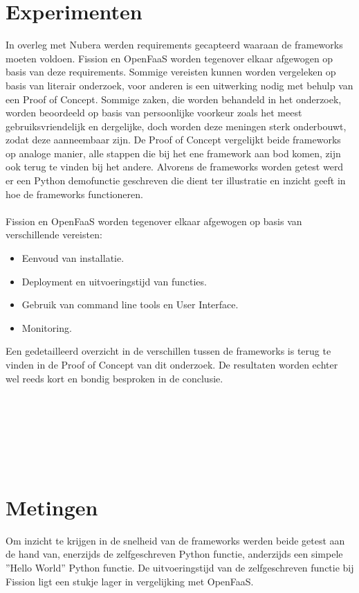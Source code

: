 \documentclass[a0,portrait]{a0poster}
\begin{document}
\begin{multicols}{2}
\color{Black} %
\color{HoGentAccent1} 
\section*{Experimenten}
\color{black}
In overleg met Nubera werden requirements gecapteerd waaraan de frameworks moeten voldoen. Fission en OpenFaaS worden tegenover elkaar afgewogen op basis van deze requirements. Sommige vereisten kunnen worden vergeleken op basis van literair onderzoek, voor anderen is een uitwerking nodig met behulp van een Proof of Concept. 
Sommige zaken, die worden behandeld in het onderzoek, worden beoordeeld op basis van persoonlijke voorkeur zoals het meest gebruiksvriendelijk en dergelijke, doch worden deze meningen sterk onderbouwt, zodat deze aanneembaar zijn. De Proof of Concept vergelijkt beide frameworks op analoge manier, alle stappen die bij het ene framework aan bod komen, zijn ook terug te vinden bij het andere. Alvorens de frameworks worden getest werd er een Python demofunctie geschreven die dient ter illustratie en inzicht geeft in hoe de frameworks functioneren.
\\\\
Fission en OpenFaaS worden tegenover elkaar afgewogen op basis van verschillende vereisten:
\begin{itemize}
    \item Eenvoud van installatie.
    \item Deployment en uitvoeringstijd van functies.
    \item Gebruik van command line tools en User Interface.
    \item Monitoring.\\
\end{itemize}

Een gedetailleerd overzicht in de verschillen tussen de frameworks is terug te vinden in de Proof of Concept van dit onderzoek. De resultaten worden echter wel reeds kort en bondig besproken in de conclusie.
\\\\\\\\\\\\\\
\color{HoGentAccent1} 
\section*{Metingen}
\color{black}
Om inzicht te krijgen in de snelheid van de frameworks werden beide getest aan de hand van, enerzijds de zelfgeschreven Python functie, anderzijds een simpele ''Hello World'' Python functie. De uitvoeringstijd van de zelfgeschreven functie bij Fission ligt een stukje lager in vergelijking met OpenFaaS. 


\end{multicols}
\end{document}
